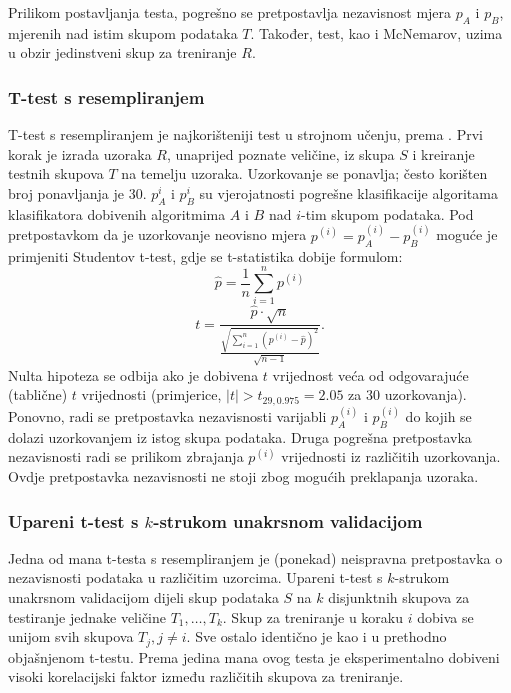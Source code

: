 Prilikom postavljanja testa, pogrešno se pretpostavlja nezavisnost mjera $p_A$ i $p_B$, mjerenih nad istim skupom podataka $T$. Također, test, kao i McNemarov, uzima u obzir jedinstveni skup za treniranje $R$.	

\subsubsection{T-test s resempliranjem}

T-test s resempliranjem je najkorišteniji test u strojnom učenju, prema \citep{dietterich1998approximate}. Prvi korak je izrada uzoraka $R$, unaprijed poznate veličine, iz skupa $S$ i kreiranje testnih skupova $T$ na temelju uzoraka. Uzorkovanje se ponavlja; često korišten broj ponavljanja je 30. $p_{A}^{i}$ i $p_{B}^{i}$ su vjerojatnosti pogrešne klasifikacije algoritama klasifikatora dobivenih algoritmima $A$ i $B$ nad $i$-tim skupom podataka. Pod pretpostavkom da je uzorkovanje neovisno mjera $p^{(i)} = p^{(i)}_{A} - p_{B}^{(i)}$ moguće je primjeniti Studentov t-test, gdje se t-statistika dobije formulom:
\begin{equation}
\hat{p} = \frac{1}{n}\sum_{i=1}^{n} p^{(i)}
\end{equation}
\begin{equation}
t = \frac{\hat{p} \cdot \sqrt{n}}{\frac{\sqrt{\sum_{i=1}^{n} (p^{(i)}-\hat{p})^2}}{\sqrt{n-1}}}.
\end{equation}
Nulta hipoteza se odbija ako je dobivena $t$ vrijednost veća od odgovarajuće (tablične) $t$ vrijednosti (primjerice, $|t|>t_{29,0.975} = 2.05$ za 30 uzorkovanja). Ponovno, radi se pretpostavka nezavisnosti varijabli $p_{A}^{(i)}$ i $p_{B}^{(i)}$ do kojih se dolazi uzorkovanjem iz istog skupa podataka. Druga pogrešna pretpostavka nezavisnosti radi se prilikom zbrajanja $p^{(i)}$ vrijednosti iz različitih uzorkovanja. Ovdje pretpostavka nezavisnosti ne stoji zbog mogućih preklapanja uzoraka.

\subsubsection{Upareni t-test s $k$-strukom unakrsnom validacijom}

Jedna od mana t-testa s resempliranjem je (ponekad) neispravna pretpostavka o nezavisnosti podataka u različitim uzorcima. Upareni t-test s $k$-strukom unakrsnom validacijom dijeli skup podataka $S$ na $k$ disjunktnih skupova za testiranje jednake veličine $T_1, \dots ,T_k$. Skup za treniranje u koraku $i$ dobiva se unijom svih skupova $T_j, j\neq i$. Sve ostalo identično je kao i u prethodno objašnjenom t-testu. Prema \citep{dietterich1998approximate} jedina mana ovog testa je eksperimentalno dobiveni visoki korelacijski faktor između različitih skupova za treniranje. 

